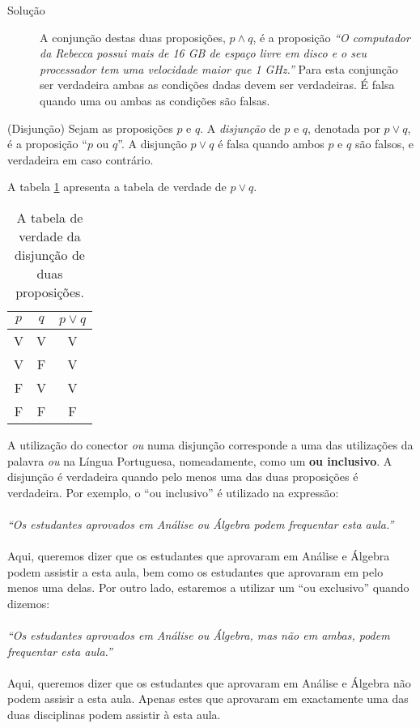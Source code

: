 \begin{description}
	\item[Solução] A conjunção destas duas proposições, $p \land q$, é a proposição
	\emph{``O computador da Rebecca possui mais de 16 GB de espaço livre em disco
	e o seu processador tem uma velocidade maior que 1 GHz.''} Para esta conjunção
	ser verdadeira ambas as condições dadas devem ser verdadeiras.  É falsa quando
	uma ou ambas as condições são falsas.
\end{description}

\label{def13}
\begin{defn}
(Disjunção) Sejam as proposições $p$ e $q$. A
	\emph{disjunção} de $p$ e $q$, denotada por $p \lor q$, é a proposição ``$p$
	ou $q$''. A disjunção $p \lor q$ é falsa quando ambos $p$ e $q$ são
	falsos, e verdadeira em caso contrário.
\end{defn}

A tabela \ref{tab13} apresenta a tabela de verdade de $p \lor q$.

\begin{table}[H]
\centering
\begin{tabular}{|c|c|c|}%
\toprule
\textbf{$p$} & \textbf{$q$} & \textbf{$p \lor q$}\\ 
\midrule
V & V & V\\
V &	F & V\\
F &	V & V\\
F &	F & F\\
\bottomrule%
\end{tabular}%
\caption{A tabela de verdade da disjunção de duas proposições.}
\label{tab13}
\end{table}

A utilização do conector \emph{ou} numa disjunção corresponde a uma das
utilizações da palavra \emph{ou} na Língua Portuguesa, nomeadamente,
como um \textbf{ou inclusivo}. A disjunção é verdadeira quando pelo menos uma
das duas proposições é verdadeira. Por exemplo, o ``ou inclusivo'' é utilizado na
expressão:\\ \\
\emph{``Os estudantes aprovados em Análise ou Álgebra podem frequentar esta
aula.''}\\ \\
Aqui, queremos dizer que os estudantes que aprovaram em Análise e Álgebra podem
assistir a esta aula, bem como os estudantes que aprovaram em pelo menos uma
delas. Por outro lado, estaremos a utilizar um ``ou exclusivo'' quando
dizemos:\\
\\
\emph{``Os estudantes aprovados em Análise ou Álgebra, mas não em ambas, podem
frequentar esta aula.''}\\ \\
Aqui, queremos dizer que os estudantes que aprovaram em Análise e Álgebra não
podem assisir a esta aula. Apenas estes que aprovaram em exactamente uma das duas
disciplinas podem assistir à esta aula.

